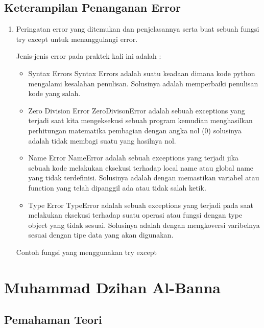 \subsection{Keterampilan Penanganan Error}
\begin{enumerate}
	\item Peringatan error yang ditemukan dan penjelasannya serta buat sebuah fungsi try except untuk menanggulangi error.
	
	Jenis-jenis error pada praktek kali ini adalah :
	\begin{itemize}
	\item Syntax Errors
	Syntax Errors adalah suatu keadaan dimana kode python mengalami kesalahan penulisan. Solusinya adalah memperbaiki penulisan kode yang salah.
	
	\item Zero Division Error
	ZeroDivisonError adalah sebuah exceptions yang terjadi saat kita mengeksekusi sebuah program kemudian menghasilkan perhitungan matematika pembagian dengan angka nol (0) solusinya adalah tidak membagi suatu yang hasilnya nol.
	
	\item Name Error
	NameError adalah sebuah exceptions yang terjadi jika sebuah kode melakukan eksekusi terhadap local name atau global name yang tidak terdefinisi. Solusinya adalah dengan memastikan variabel atau function yang telah dipanggil ada atau tidak salah ketik.
	
	\item Type Error
	TypeError adalah sebuah exceptions yang terjadi pada saat melakukan eksekusi terhadap suatu operasi atau fungsi dengan type object yang tidak sesuai. Solusinya adalah dengan mengkoversi varibelnya sesuai dengan tipe data yang akan digunakan.
	\end{itemize}
	
	Contoh fungsi yang menggunakan try except
	
\end{enumerate}


\section{Muhammad Dzihan Al-Banna}
\subsection{Pemahaman Teori}
